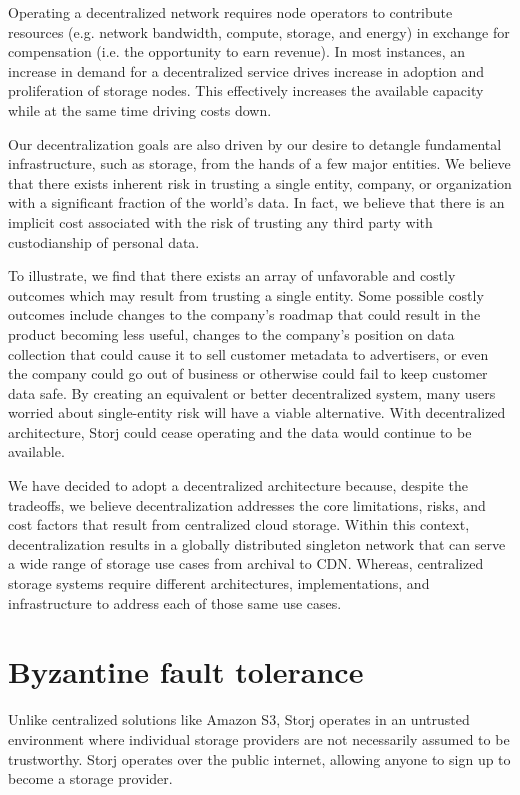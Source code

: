 \documentclass[11pt,fleqn,openany]{book}
\begin{document}
Operating a decentralized network requires node operators to contribute
resources (e.g. network bandwidth, compute, storage, and energy) in exchange
for compensation (i.e. the opportunity to earn revenue).
In most instances, an increase in demand for a decentralized service drives
increase in adoption and proliferation of storage nodes.
This effectively increases the available capacity while at the same time
driving costs down.

Our decentralization goals are also driven by our desire to detangle
fundamental infrastructure, such as storage, from the hands of a few major
entities.
We believe that there exists inherent risk in trusting a single entity,
company, or organization with a significant fraction of the world's data.
In fact, we believe that there is an implicit cost associated with the risk of
trusting any third party with custodianship of personal data.

To illustrate, we find that there exists an array of unfavorable
and costly outcomes which may result from trusting a single entity.
Some possible costly outcomes include changes to the company's roadmap that could result in the product
becoming less useful, changes to the company's position on data collection that could
cause it to sell customer metadata to advertisers, or even the company could go
out of business or otherwise could fail to keep customer data safe.
By creating an equivalent or better decentralized
system, many users worried about single-entity risk will have a viable
alternative.
With decentralized architecture, Storj could cease operating and the data
would continue to be available.

We have decided to adopt a decentralized architecture because, despite the tradeoffs, we believe decentralization addresses the core limitations,
risks, and cost factors that result from centralized cloud storage.
Within this context,
decentralization results in a globally distributed singleton network that can
serve a wide range of storage use cases from archival to CDN. Whereas,
centralized storage systems require different architectures, implementations,
and infrastructure to address each of those same use cases.

\section{Byzantine fault tolerance}

Unlike centralized solutions like Amazon S3, Storj operates in an untrusted
environment where individual storage providers are not necessarily assumed to be
trustworthy. Storj operates over the public internet, allowing anyone to sign
up to become a storage provider.
\end{document}
